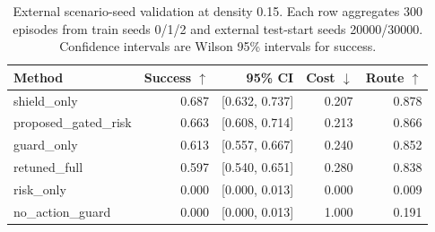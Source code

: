 \begin{table}[t]
\centering
\small
\begin{tabular}{lrrrr}
\toprule
Method & Success $\uparrow$ & 95\% CI & Cost $\downarrow$ & Route $\uparrow$ \\
\midrule
shield\_only & 0.687 & [0.632, 0.737] & 0.207 & 0.878 \\
proposed\_gated\_risk & 0.663 & [0.608, 0.714] & 0.213 & 0.866 \\
guard\_only & 0.613 & [0.557, 0.667] & 0.240 & 0.852 \\
retuned\_full & 0.597 & [0.540, 0.651] & 0.280 & 0.838 \\
risk\_only & 0.000 & [0.000, 0.013] & 0.000 & 0.009 \\
no\_action\_guard & 0.000 & [0.000, 0.013] & 1.000 & 0.191 \\
\bottomrule
\end{tabular}
\caption{External scenario-seed validation at density 0.15. Each row aggregates 300 episodes from train seeds 0/1/2 and external test-start seeds 20000/30000. Confidence intervals are Wilson 95\% intervals for success.}
\label{tab:external-seed-d015}
\end{table}
